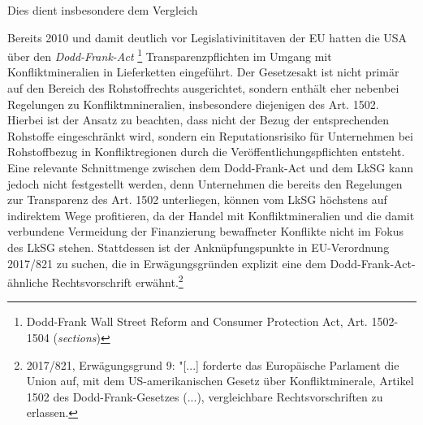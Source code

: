 \documentclass[12pt,a4paper,oneside]{book} %
\begin{document}
	Dies dient insbesondere dem Vergleich 
	
	Bereits 2010 und damit deutlich vor Legislativinititaven der EU hatten die USA über den \textit{Dodd-Frank-Act} \footnote{Dodd-Frank Wall Street Reform and Consumer Protection Act, Art. 1502-1504 (\textit{sections})} Transparenzpflichten im Umgang mit Konfliktmineralien in Lieferketten eingeführt. Der Gesetzesakt ist nicht primär auf den Bereich des Rohstoffrechts ausgerichtet, sondern enthält eher nebenbei Regelungen zu Konfliktmnineralien, insbesondere diejenigen des Art. 1502.  Hierbei ist der Ansatz zu beachten, dass nicht der Bezug der entsprechenden Rohstoffe eingeschränkt wird, sondern ein Reputationsrisiko für Unternehmen bei Rohstoffbezug in Konfliktregionen durch die Veröffentlichungspflichten entsteht.\autocite[Rn. 415]{ruttloff_lieferkettensorgfaltspflichtengesetz_2022} Eine relevante Schnittmenge zwischen dem Dodd-Frank-Act und dem LkSG kann jedoch nicht festgestellt werden, denn Unternehmen die bereits den Regelungen zur Transparenz des Art. 1502 unterliegen, können vom LkSG höchstens auf indirektem Wege profitieren, da der Handel mit Konfliktmineralien und die damit verbundene Vermeidung der Finanzierung bewaffneter Konflikte nicht im Fokus des LkSG stehen.\autocite[Rn 423]{ruttloff_lieferkettensorgfaltspflichtengesetz_2022} Stattdessen ist der Anknüpfungspunkte in EU-Verordnung 2017/821 zu suchen, die in Erwägungsgründen explizit eine dem Dodd-Frank-Act-ähnliche Rechtsvorschrift erwähnt.\footnote{2017/821, Erwägungsgrund 9: "[...] forderte das Europäische Parlament die Union auf, mit dem US-amerikanischen Gesetz über Konfliktminerale, Artikel 1502 des Dodd-Frank-Gesetzes (...), vergleichbare Rechtsvorschriften zu erlassen.} 
	
	
	
\end{document}
